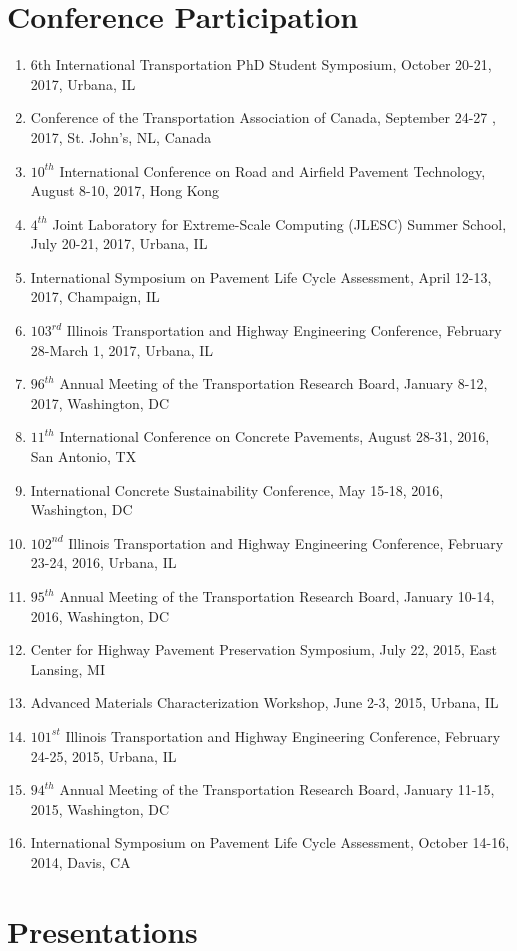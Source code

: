 \documentclass[12pt]{article}
\begin{document}
\section*{Conference Participation}
\begin{enumerate}[label=(\arabic*)]
	\item 6th International Transportation PhD Student Symposium, October 20-21, 2017, Urbana, IL
	\item Conference of the Transportation Association of Canada, September 24-27 , 2017, St. John’s, NL, Canada
	\item $10^{th}$ International Conference on Road and Airfield Pavement Technology, August 8-10, 2017, Hong Kong
	\item $4^{th}$ Joint Laboratory for Extreme-Scale Computing (JLESC) Summer School, July 20-21, 2017, Urbana, IL
	\item International Symposium on Pavement Life Cycle Assessment, April 12-13, 2017, Champaign, IL
	\item $103^{rd}$ Illinois Transportation and Highway Engineering Conference, February 28-March 1, 2017, Urbana, IL
	\item $96^{th}$ Annual Meeting of the Transportation Research Board, January 8-12, 2017, Washington, DC
	\item $11^{th}$ International Conference on Concrete Pavements, August 28-31, 2016, San Antonio, TX
	\item International Concrete Sustainability Conference, May 15-18, 2016, Washington, DC
	\item $102^{nd}$ Illinois Transportation and Highway Engineering Conference, February 23-24, 2016, Urbana, IL
	\item $95^{th}$ Annual Meeting of the Transportation Research Board, January 10-14, 2016, Washington, DC
	\item Center for Highway Pavement Preservation Symposium, July 22, 2015, East Lansing, MI
	\item Advanced Materials Characterization Workshop, June 2-3, 2015, Urbana, IL
	\item $101^{st}$ Illinois Transportation and Highway Engineering Conference, February 24-25, 2015, Urbana, IL
	\item $94^{th}$ Annual Meeting of the Transportation Research Board, January 11-15, 2015, Washington, DC
	\item International Symposium on Pavement Life Cycle Assessment, October 14-16, 2014, Davis, CA
\end{enumerate}

\section*{Presentations}
\end{document}
